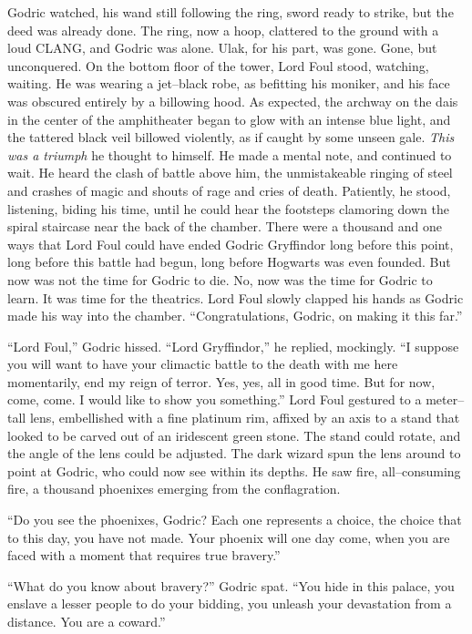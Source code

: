 Godric watched, his wand still following the ring, sword ready to strike, but the deed was already done. The ring, now a hoop, clattered to the ground with a loud CLANG, and Godric was alone.
\SomeVSpace
Ulak, for his part, was gone. Gone, but unconquered.
\simpleline
On the bottom floor of the tower, Lord Foul stood, watching, waiting. He was wearing a jet\mbox{--}black robe, as befitting his moniker, and his face was obscured entirely by a billowing hood. As expected, the archway on the dais in the center of the amphitheater began to glow with an intense blue light, and the tattered black veil billowed violently, as if caught by some unseen gale.
\SmallVSpace
\emph{This was a triumph{\el}} he thought to himself. He made a mental note, and continued to wait. He heard the clash of battle above him, the unmistakeable ringing of steel and crashes of magic and shouts of rage and cries of death. Patiently, he stood, listening, biding his time, until he could hear the footsteps clamoring down the spiral staircase near the back of the chamber.
\SmallVSpace
There were a thousand and one ways that Lord Foul could have ended Godric Gryffindor long before this point, long before this battle had begun, long before Hogwarts was even founded. But now was not the time for Godric to die. No, now was the time for Godric to learn. It was time for the theatrics.
\SomeVSpace
Lord Foul slowly clapped his hands as Godric made his way into the chamber.
\SmallVSpace
“Congratulations, Godric, on making it this far.”

“Lord Foul,” Godric hissed.
\SmallVSpace
“Lord Gryffindor,” he replied, mockingly. “I suppose you will want to have your climactic battle to the death with me here momentarily, end my reign of terror. Yes, yes, all in good time. But for now, come, come. I would like to show you something.”
\SmallVSpace
Lord Foul gestured to a meter\mbox{--}tall lens, embellished with a fine platinum rim, affixed by an axis to a stand that looked to be carved out of an iridescent green stone. The stand could rotate, and the angle of the lens could be adjusted. The dark wizard spun the lens around to point at Godric, who could now see within its depths. He saw fire, all\mbox{--}consuming fire, a thousand phoenixes emerging from the conflagration.

“Do you see the phoenixes, Godric? Each one represents a choice, the choice that to this day, you have not made. Your phoenix will one day come, when you are faced with a moment that requires true bravery.”

“What do you know about bravery?” Godric spat. “You hide in this palace, you enslave a lesser people to do your bidding, you unleash your devastation from a distance. You are a coward.”

